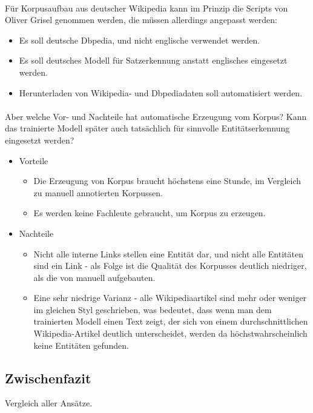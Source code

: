 \paragraph{} 
Für Korpusaufbau aus deutscher Wikipedia kann im Prinzip die Scripts von Oliver Grisel genommen werden, die müssen allerdings angepasst werden:
\begin{itemize}
\item Es soll deutsche Dbpedia, und nicht englische verwendet werden.
\item Es soll deutsches Modell für Satzerkennung anstatt englisches eingesetzt werden.
\item Herunterladen von Wikipedia- und Dbpediadaten soll automatisiert werden.
\end{itemize}

\paragraph{}
Aber welche Vor- und Nachteile hat automatische Erzeugung vom Korpus? Kann das trainierte Modell später auch tatsächlich für sinnvolle Entitätserkennung eingesetzt werden?
\begin{itemize}
\item Vorteile
\begin{itemize}
\item Die Erzeugung von Korpus braucht höchstens eine Stunde, im Vergleich zu manuell annotierten Korpussen.
\item Es werden keine Fachleute gebraucht, um Korpus zu erzeugen.
\end{itemize}
\item Nachteile
\begin{itemize}
\item Nicht alle interne Links stellen eine Entität dar, und nicht alle Entitäten sind ein Link - als Folge ist die Qualität des Korpusses deutlich niedriger, als die von manuell aufgebauten.
\item Eine sehr niedrige Varianz - alle Wikipediaartikel sind mehr oder weniger im gleichen Styl geschrieben, was bedeutet, dass wenn man dem trainierten Modell einen Text zeigt, der sich von einem durchschnittlichen Wikipedia-Artikel deutlich unterscheidet, werden da höchstwahrscheinlich keine Entitäten gefunden.
\end{itemize}
\end{itemize}

\subsection{Zwischenfazit}
Vergleich aller Ansätze.

